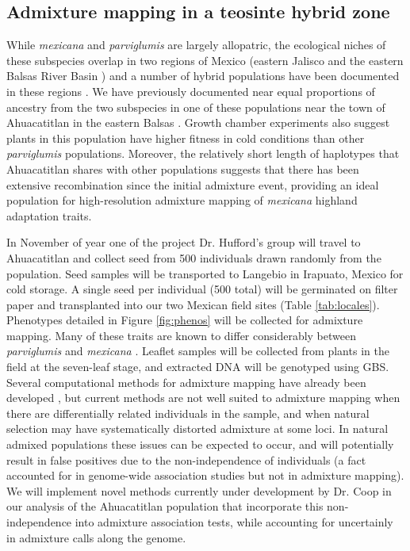 \subsection{Admixture mapping in a teosinte hybrid zone} \label{subsec:admixmap}
While \emph{mexicana} and \emph{parviglumis} are largely allopatric, the ecological niches of these subspecies overlap in two regions of Mexico (eastern Jalisco and the eastern Balsas River Basin \citep{hufford2012inferences}) and a number of hybrid populations have been documented in these regions \citep{Fukunaga2005}.  We have previously documented near equal proportions of ancestry from the two subspecies in one of these populations near the town of Ahuacatitlan in the eastern Balsas \citep{Pyhajarvi2013}.  Growth chamber experiments also suggest plants in this population have higher fitness in cold conditions than other \emph{parviglumis} populations.  Moreover, the relatively short length of  haplotypes that Ahuacatitlan shares with other  populations suggests that there has been extensive recombination since the initial admixture event, providing an ideal population for high-resolution admixture mapping of \emph{mexicana} highland adaptation traits.

In November of year one of the project Dr. Hufford's group will travel to Ahuacatitlan and collect seed from 500 individuals drawn randomly from the population.  Seed samples will be transported to Langebio in Irapuato, Mexico for cold storage. A single seed per individual (500 total) will be germinated on filter paper and transplanted into our two Mexican field sites (Table \ref{tab:locales}).  Phenotypes detailed in Figure \ref{fig:phenos} will be collected for admixture mapping.  Many of these traits are known to differ considerably between \emph{parviglumis} and \emph{mexicana} \citep{wilkes1967teosinte}.  Leaflet samples will be collected from plants in the field at the seven-leaf stage, and extracted DNA will be genotyped using GBS.  Several computational methods for admixture mapping have already been developed \citep{winkler2010admixture}, but current methods are not well suited to admixture mapping when there are differentially related individuals in the sample, and when natural selection may have systematically distorted admixture at some loci. In natural admixed populations these issues can be expected to occur, and will potentially result in false positives due to the non-independence of individuals (a fact accounted for in genome-wide association studies but not in admixture mapping). We will implement novel methods currently under development by Dr. Coop in our analysis of the Ahuacatitlan population that incorporate this non-independence into admixture association tests, while accounting for uncertainly in admixture calls along the genome. 


